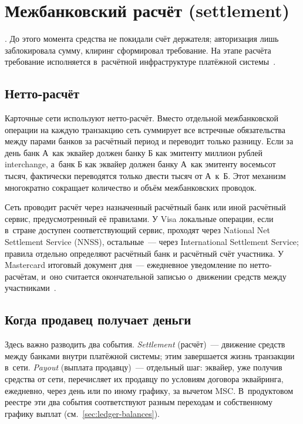 \section{Межбанковский расчёт (settlement)}\label{sec:tx-settlement}

. До этого момента средства
не покидали счёт держателя; авторизация лишь заблокировала сумму,
клиринг сформировал требование. На этапе расчёта требование
исполняется в~расчётной инфраструктуре платёжной
системы~\cite{fz-161,visa-core-rules,mc-tpr}.

\subsection*{Нетто-расчёт}

Карточные сети используют нетто-расчёт. Вместо отдельной
межбанковской операции на каждую транзакцию сеть суммирует все
встречные обязательства между парами банков за расчётный период
и переводит только разницу. Если за день банк А~как эквайер должен
банку Б как эмитенту миллион рублей interchange, а~банк Б как
эквайер должен банку А~как эмитенту восемьсот тысяч, фактически
переводятся только двести тысяч от А~к~Б. Этот механизм
многократно сокращает количество и объём межбанковских проводок.

Сеть проводит расчёт через назначенный расчётный банк или иной
расчётный сервис, предусмотренный её правилами. У Visa локальные
операции, если в~стране доступен соответствующий сервис, проходят
через National Net Settlement Service (NNSS), остальные~---
через International Settlement Service; правила отдельно определяют
расчётный банк и расчётный счёт участника. У Mastercard итоговый
документ дня~--- ежедневное уведомление по нетто-расчётам, и~оно
считается окончательной записью о~движении средств между
участниками~\cite{visa-core-rules,mc-tpr}.

\subsection*{Когда продавец получает деньги}

Здесь важно разводить два события. \emph{Settlement} (расчёт)~---
движение средств между банками внутри платёжной системы; этим
завершается жизнь транзакции в~сети. \emph{Payout} (выплата
продавцу)~--- отдельный шаг: эквайер, уже получив средства от
сети, перечисляет их продавцу по условиям договора эквайринга,
ежедневно, через день или по иному графику, за вычетом MSC.
В~продуктовом реестре эти два события соответствуют разным
переходам и собственному графику выплат
(см.~\ref{sec:ledger-balances}).

